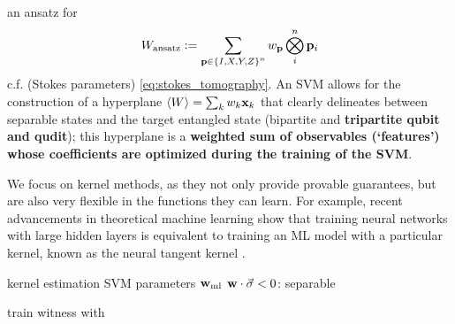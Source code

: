 \documentclass[
reprint,
aps,
pra,
]{revtex4-2}
\theoremstyle{plain}
\theoremstyle{definition}
\newcommand{\ew}{W}
\newcommand{\ml}{\text{ml}}
\newcommand{\ansatz}{\textup{ansatz}}
\newcommand{\sx}{\hat{\sigma}_x}
\newcommand{\sy}{\hat{\sigma}_y}
\newcommand{\sz}{\hat{\sigma}_z}
\begin{document}
an ansatz for  
\begin{equation}
	\ew_{\ansatz} := 
	\sum_{\vb{p}\in \qty{I,X,Y,Z}^n} w_{\vb{p}}  
	\bigotimes_i^n 
	\vb{p}_i
\end{equation}
c.f.  (Stokes parameters) \cref{eq:stokes_tomography}.
An SVM allows for the construction of a hyperplane $\expval{\ew}=\sum_k w_k \vbx_{k}$ that clearly delineates between separable states and the target entangled state (bipartite and \textbf{tripartite qubit and qudit}); this hyperplane is a \textbf{weighted sum of observables (`features') whose coefficients are optimized during the training of the SVM}.

We focus on kernel methods, as they not only provide provable guarantees, but are also very flexible in the functions they can learn. For example, recent advancements in theoretical machine learning show that training neural networks with large hidden layers is equivalent to training an ML model with a particular kernel, known as the neural tangent kernel \cite{jacotNeuralTangentKernel2020}.

\begin{algorithm}[H]
    \DontPrintSemicolon
    \Output{classifier $\vbw_{\ml}$}
    \BlankLine
     {
        kernel estimation 
        SVM 
    {\Return parameters $\vbw_{\ml}$} 
    }
    \Return $ \vb{w}\cdot \vec{\sigma}<0 $: \textsf{separable} 
    \caption{train witness with  }
    \label{alg:classical_learning}
\end{algorithm}
\end{document}
